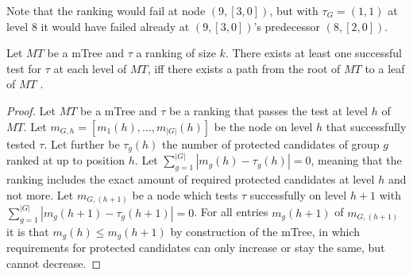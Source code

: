 %
Note that the ranking would fail at node $(9, [3,0])$, but with $\tau_G = (1,1)$ at level 8 it would have failed already at $(9, [3,0])$'s predecessor $(8, [2,0])$.
%
\begin{theorem}
\label{theorem:lazy-mTree-test}
Let $MT$ be a mTree and $\tau$ a ranking of size $k$.
%
There exists at least one successful test for $\tau$ at each level of $MT$,
iff there exists a  path from the root of $MT$ to a leaf of $MT$ .
\end{theorem}
%
\begin{proof}
	\label{proof:lazy-mTree-test}
	Let $MT$ be a mTree and $\tau$ be a ranking that passes the test at level $h$ of $MT$.
	Let $m_{G,h}=[m_{1}(h), \ldots, m_{|G|}(h)]$ be the node on level $h$ that successfully tested $\tau$.
	Let further be $\tau_g(h)$ the number of protected candidates of group $g$ ranked at up to position $h$.
	Let $\sum_{g=1}^{|G|} |m_{g}(h) - \tau_{g}(h)| = 0$, meaning that the ranking includes the exact amount of required protected candidates at level $h$ and not more. 
	Let $m_{G,(h+1)}$ be a node which tests $\tau$ successfully on level $h+1$ with $\sum_{g=1}^{|G|} |m_{g}(h+1) - \tau_{g}(h+1)| = 0$.
	For all entries $m_{g}(h+1)$ of $m_{G,(h+1)}$ it is that $m_{g}(h) \leq m_{g}(h+1)$ by construction of the mTree, in which requirements for protected candidates can only increase or stay the same, but cannot decrease.


\end{proof}
